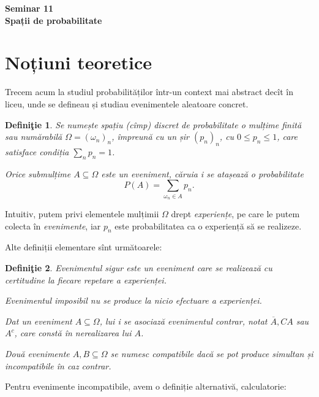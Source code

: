 \documentclass[12pt,a4paper]{article}
\newcommand\ds{\displaystyle}
\newcommand\seq{\subseteq}
\theoremstyle{dotless}
\theoremstyle{dotlessdr}
\newtheorem{definition}{Defini\c{t}ie}
\begin{document}
\begin{center}
  {\large\textbf{Seminar 11 \\ Spații de probabilitate}}
\end{center}

\vspace{2cm}

\section*{Noțiuni teoretice}

\indent\indent Trecem acum la studiul probabilităților într-un context mai abstract
decît în liceu, unde se defineau și studiau evenimentele aleatoare concret.

\begin{definition}\label{def:spatiu-discret-prob}
  Se numește \emph{spațiu (cîmp) discret de probabilitate} o mulțime finită sau numărabilă
  $ \Omega = (\omega_n)_n $, împreună cu un șir $ (p_n)_n $, cu $ 0 \leq p_n \leq 1 $,
  care satisface condiția $ \ds\sum_n p_n = 1 $.

  Orice submulțime $ A \seq \Omega $ este un \emph{eveniment}, căruia i se atașează
  o probabilitate
  \[
    P(A) = \ds\sum_{\omega_n \in A} p_n.
  \]
\end{definition}

Intuitiv, putem privi elementele mulțimii $ \Omega $ drept \emph{experiențe}, pe
care le putem colecta în \emph{evenimente}, iar $ p_n $ este probabilitatea ca o
experiență să se realizeze.

Alte definiții elementare sînt următoarele:

\begin{definition}\label{def:evenimente}
  \emph{Evenimentul sigur} este un eveniment care se realizează cu certitudine la
  fiecare repetare a experienței.

  \emph{Evenimentul imposibil} nu se produce la nicio efectuare a experienței.

  Dat un eveniment $ A \seq \Omega $, lui i se asociază \emph{evenimentul contrar},
  notat $ \overline{A}, CA $ sau $ A^c $, care constă în nerealizarea lui $ A $.

  Două evenimente $ A, B \seq \Omega $ se numesc \emph{compatibile} dacă se
  pot produce simultan și \emph{incompatibile} în caz contrar.
\end{definition}

Pentru evenimente incompatibile, avem o definiție alternativă, calculatorie:
\end{document}
